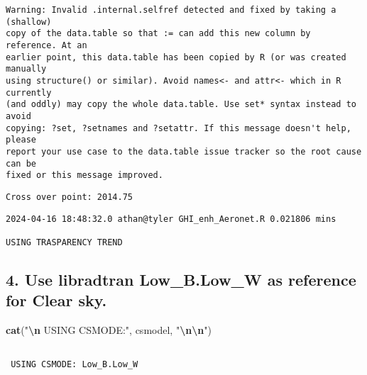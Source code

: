 \documentclass[
  10pt,
  a4paper,oneside]{article}
\newenvironment{Shaded}{\begin{snugshade}}{\end{snugshade}}
\newcommand{\FunctionTok}[1]{\textcolor[rgb]{0.13,0.29,0.53}{\textbf{#1}}}
\newcommand{\NormalTok}[1]{#1}
\newcommand{\SpecialCharTok}[1]{\textcolor[rgb]{0.81,0.36,0.00}{\textbf{#1}}}
\newcommand{\StringTok}[1]{\textcolor[rgb]{0.31,0.60,0.02}{#1}}
\begin{document}
\begin{verbatim}
Warning: Invalid .internal.selfref detected and fixed by taking a (shallow)
copy of the data.table so that := can add this new column by reference. At an
earlier point, this data.table has been copied by R (or was created manually
using structure() or similar). Avoid names<- and attr<- which in R currently
(and oddly) may copy the whole data.table. Use set* syntax instead to avoid
copying: ?set, ?setnames and ?setattr. If this message doesn't help, please
report your use case to the data.table issue tracker so the root cause can be
fixed or this message improved.
\end{verbatim}

\begin{verbatim}
Cross over point: 2014.75 
\end{verbatim}

\begin{verbatim}
2024-04-16 18:48:32.0 athan@tyler GHI_enh_Aeronet.R 0.021806 mins

USING TRASPARENCY TREND
\end{verbatim}

\hypertarget{use-libradtran-low_b.low_w-as-reference-for-clear-sky.}{%
\subsection{\texorpdfstring{4. Use libradtran \textbf{Low\_B.Low\_W} as reference for Clear sky.}{4. Use libradtran Low\_B.Low\_W as reference for Clear sky.}}\label{use-libradtran-low_b.low_w-as-reference-for-clear-sky.}}

\begin{Shaded}
\begin{Highlighting}[]
\FunctionTok{cat}\NormalTok{(}\StringTok{"}\SpecialCharTok{\textbackslash{}n}\StringTok{ USING CSMODE:"}\NormalTok{, csmodel, }\StringTok{"}\SpecialCharTok{\textbackslash{}n\textbackslash{}n}\StringTok{"}\NormalTok{)}
\end{Highlighting}
\end{Shaded}

\begin{verbatim}

 USING CSMODE: Low_B.Low_W 
\end{verbatim}
\end{document}
